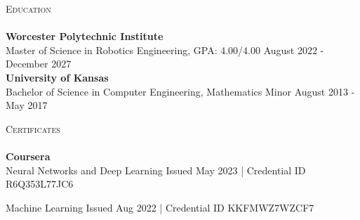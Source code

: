 \documentclass[a4paper]{article}
\newcommand{\lineunder} {
    \vspace*{-8pt} \\
    \hspace*{-18pt} \hrulefill \\
}
\newcommand{\header} [1] {
    {\hspace*{-18pt}\vspace*{6pt} \textsc{#1}}
    \vspace*{-6pt} \lineunder
}
\begin{document}
\header{Education}
\textbf{Worcester Polytechnic Institute}\\
Master of Science in Robotics Engineering, GPA: 4.00/4.00 \hfill August 2022 - December 2027\\
\vspace{2mm}
\textbf{University of Kansas}\\
Bachelor of Science in Computer Engineering, Mathematics Minor \hfill August 2013 - May 2017\\

\vspace{5mm}

\header{Certificates}
{\textbf{Coursera}}\\
\vspace{2mm}
Neural Networks and Deep Learning \hfill Issued May 2023 | \footnotesize{Credential ID R6Q353L77JC6}

\normalsize{}

\vspace{2mm}
Machine Learning \hfill Issued Aug 2022 | \footnotesize{Credential ID KKFMWZ7WZCF7}
\end{document}
